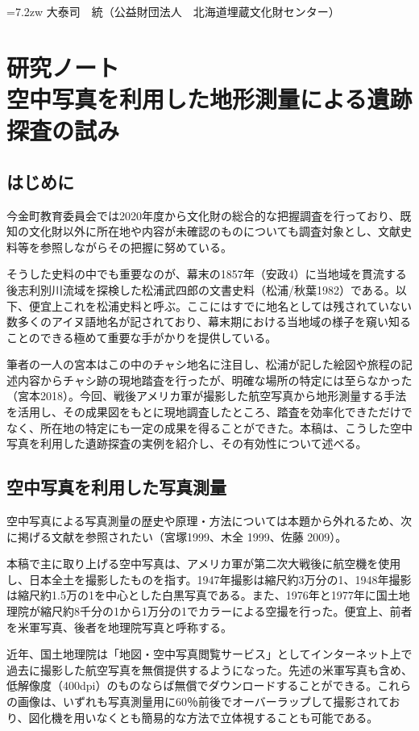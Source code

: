 \documentclass[a4j,11pt,twocolumn,openany]{jsbook}
\begin{document}
\vspace{1\baselineskip}
\hangindent=7.2zw
大泰司　統（公益財団法人　北海道埋蔵文化財センター）


\chapter{研究ノート\\空中写真を利用した地形測量による遺跡探査の試み}

\section{はじめに}
今金町教育委員会では2020年度から文化財の総合的な把握調査を行っており、既知の文化財以外に所在地や内容が未確認のものについても調査対象とし、文献史料等を参照しながらその把握に努めている。

そうした史料の中でも重要なのが、幕末の1857年（安政4）に当地域を貫流する後志利別川流域を探検した松浦武四郎の文書史料（松浦/秋葉1982）である。以下、便宜上これを松浦史料と呼ぶ。ここにはすでに地名としては残されていない数多くのアイヌ語地名が記されており、幕末期における当地域の様子を窺い知ることのできる極めて重要な手がかりを提供している。

筆者の一人の宮本はこの中のチャシ地名に注目し、松浦が記した絵図や旅程の記述内容からチャシ跡の現地踏査を行ったが、明確な場所の特定には至らなかった（宮本2018）。今回、戦後アメリカ軍が撮影した航空写真から地形測量する手法を活用し、その成果図をもとに現地調査したところ、踏査を効率化できただけでなく、所在地の特定にも一定の成果を得ることができた。本稿は、こうした空中写真を利用した遺跡探査の実例を紹介し、その有効性について述べる。

\section{空中写真を利用した写真測量}

空中写真による写真測量の歴史や原理・方法については本題から外れるため、次に掲げる文献を参照されたい（宮塚1999、木全 1999、佐藤 2009）。

本稿で主に取り上げる空中写真は、アメリカ軍が第二次大戦後に航空機を使用し、日本全土を撮影したものを指す。1947年撮影は縮尺約3万分の1、1948年撮影は縮尺約1.5万の1を中心とした白黒写真である。また、1976年と1977年に国土地理院が縮尺約8千分の1から1万分の1でカラーによる空撮を行った。便宜上、前者を米軍写真、後者を地理院写真と呼称する。

近年、国土地理院は「地図・空中写真閲覧サービス」としてインターネット上で過去に撮影した航空写真を無償提供するようになった。先述の米軍写真も含め、低解像度（400dpi）のものならば無償でダウンロードすることができる。これらの画像は、いずれも写真測量用に60％前後でオーバーラップして撮影されており、図化機を用いなくとも簡易的な方法で立体視することも可能である。
\end{document}

